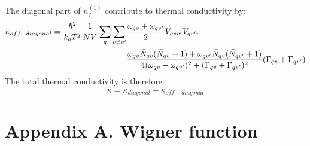 \documentclass{article}
\begin{document}
The diagonal part of $n^{(1)}_{q}$ contribute to thermal conductivity by:
\begin{align}
    \kappa_{off-diagonal} = \frac{\hbar^2}{k_b T^2} \frac{1}{NV} \sum_{q}\sum_{v\neq v'} &\frac{\omega_{qv} + \omega_{qv'}}{2} V_{qvv'} V_{qv'v} \notag \\
    & \frac{\omega_{qv}\bar{N}_{qv} (\bar{N}_{qv} + 1) + \omega_{qv'} \bar{N}_{qv} (\bar{N}_{qv'} + 1)}{4(\omega_{qv} - \omega_{qv'})^2 + (\Gamma_{qv}+ \Gamma_{qv'})^2}(\Gamma_{qv}+ \Gamma_{qv'})
\end{align}
The total thermal conductivity is therefore:
\begin{equation}
    \kappa = \kappa_{diagonal} + \kappa_{off-diagonal}
\end{equation}

\pagebreak
\section*{Appendix A. Wigner function}
\end{document}
